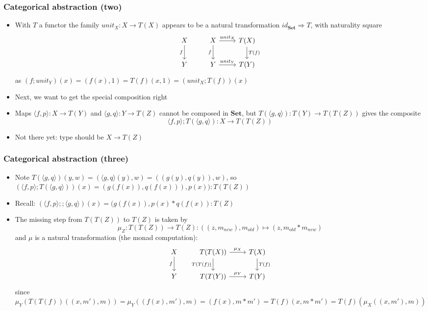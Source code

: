 \documentclass[handout]{beamer}
\newcommand{\To}{\Rightarrow}
\newcommand{\bfsf}[1]{{\boldsymbol{#1}}}
\newcommand{\Set}{\bfsf{Set}}
\newcommand{\Kp}[1]{{\langle #1 \rangle}}
\newcommand{\Kc}{;\!;}
\begin{document}
\frame
  {   
    \frametitle{Categorical abstraction (two)}\label{Mon5:CatAbstrTwo}

 \begin{itemize}[<+->]
\item With $T$ a functor the family $unit_X: X\to T(X)$ appears to be
a natural transformation $id_\Set \To T$, with naturality square
\[
\begin{tikzcd}[ampersand replacement=\&]
X \arrow[swap]{d}{f} \& X  \arrow[swap]{d}{f}\arrow{r}{unit_X} \&\arrow{d}{T(f)} T(X)\\
Y \& Y  \arrow{r}{unit_Y} \& T(Y)
\end{tikzcd}
\]
as $(f;unit_Y)(x)=(f(x),1) = T(f)(x,1) = (unit_X;T(f))(x)$
\item Next,  we want to get the special composition right
\item Maps $\Kp{f,p}: X\to T(Y)$ and $\Kp{g,q}: Y\to T(Z)$ cannot be composed
in $\Set$, but $T(\Kp{g,q}) : T(Y) \to T(T(Z))$ gives the composite
$$\Kp{f,p};T(\Kp{g,q}) : X \to T(T(Z))$$
\item Not there yet: type should be $X \to T(Z)$
 \end{itemize}

 }

\frame
  {   
    \frametitle{Categorical abstraction (three)}\label{Mon5:CatAbstrThree}

 \begin{itemize}[<+->]
\item Note $T(\Kp{g,q})(y,w) =  (\Kp{g,q}(y),w) = ((g(y),q(y)),w)$, so
$(\Kp{f,p};T(\Kp{g,q}))(x) = (g(f(x)),q(f(x))),p(x)): T(T(Z))$
\item Recall: $(\Kp{f,p}\Kc \Kp{g,q})(x) = (g(f(x)),p(x)*q(f(x)) : T(Z)$
\item The missing step from $T(T(Z))$ to $T(Z)$ is taken by
$$\mu_Z: T(T(Z))\to T(Z): ((z,m_{new}),m_{old}) \mapsto (z,m_{old}*m_{new})$$
and $\mu$ is a natural transformation  (the monad computation):
\[
\begin{tikzcd}[ampersand replacement=\&]
X \arrow[swap]{d}{f} \& T(T(X))  \arrow[swap]{d}{T(T(f))}\arrow{r}{\mu_X} \&\arrow{d}{T(f)} T(X)\\
Y \& T(T(Y))  \arrow{r}{\mu_Y} \& T(Y)
\end{tikzcd}
\]
since $\mu_Y(T(T(f))((x,m'),m)) = \mu_Y((f(x),m'),m) = (f(x), m*m') 
= T(f)(x,m*m') = T(f)(\mu_X((x,m'),m))$
 \end{itemize}

 }
\end{document}
